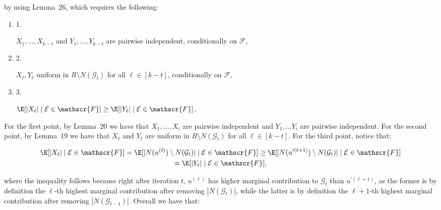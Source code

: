 \documentclass[10pt,a4paper]{article}
\begin{document}
by using Lemma 26, which requires the following:\par


\begin{enumerate}


\item[] 1. 


$X_{1},\dots,X_{k-t}$ and $Y_{1},\dots,Y_{k-t}$ are pairwise independent, conditionally on $\mathscr{F}$,\par




\item[] 2. 


$X_{\ell},Y_{\ell}$ uniform in $R\setminus N(\mathcal{G}_{t})$ for all $\ell\in[k-t]$, conditionally on $\mathscr{F}$,\par




\item[] 3. 


$\E[|X_{\ell}|\mid\mathcal{E}\in\mathscr{F}]\geq\E[|Y_{\ell}|\mid\mathcal{E}\in\mathscr{F}]$.\par




\end{enumerate}


For the first point, by Lemma 20 we have that $X_{1},\dots,X_{i}$ are pairwise independent and $Y_{1},\dots Y_{i}$ are pairwise independent.
For the second point, by Lemma 19
we have that $X_{\ell}$ and $Y_{\ell}$ are uniform in $R\setminus N(\mathcal{G}_{t})$ for all $\ell\in[k-t]$.
For the third point, notice that:\par


\[\begin{gathered}
\displaystyle\E[|X_{\ell}|\mid\mathcal{E}\in\mathscr{F}]=\E[|N(u^{(\ell)})\setminus N(\mathcal{G}_{t})|\mid\mathcal{E}\in\mathscr{F}] \displaystyle\geq\E[|N(u^{\prime(\ell+1)})\setminus N(\mathcal{G}_{t})|\mid\mathcal{E}\in\mathscr{F}] \\
\displaystyle=\E[|Y_{\ell}|\mid\mathcal{E}\in\mathscr{F}],
\end{gathered}\]


where the inequality follows because right after iteration $t$, $u^{(\ell)}$
has higher marginal contribution to $\mathcal{G}_{t}$ than $u^{\prime(\ell+1)}$, as the former is by definition the $\ell$-th highest marginal contribution after removing $|N(\mathcal{G}_{t})|$, while the latter is by definition the $\ell+1$-th highest marginal contribution after removing $|N(\mathcal{G}_{t-1})|$.
Overall we have that:\par
\end{document}
